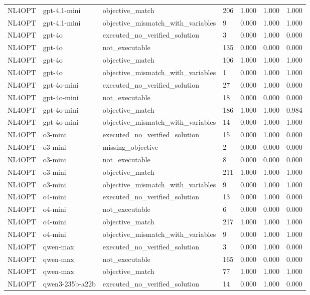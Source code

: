 \begin{table}[t]
\begin{tabular}{lllllll}
NL4OPT & gpt-4.1-mini & objective\_match & 206 & 1.000 & 1.000 & 1.000 \\
NL4OPT & gpt-4.1-mini & objective\_mismatch\_with\_variables & 9 & 0.000 & 1.000 & 1.000 \\
NL4OPT & gpt-4o & executed\_no\_verified\_solution & 3 & 0.000 & 1.000 & 0.000 \\
NL4OPT & gpt-4o & not\_executable & 135 & 0.000 & 0.000 & 0.000 \\
NL4OPT & gpt-4o & objective\_match & 106 & 1.000 & 1.000 & 1.000 \\
NL4OPT & gpt-4o & objective\_mismatch\_with\_variables & 1 & 0.000 & 1.000 & 1.000 \\
NL4OPT & gpt-4o-mini & executed\_no\_verified\_solution & 27 & 0.000 & 1.000 & 0.000 \\
NL4OPT & gpt-4o-mini & not\_executable & 18 & 0.000 & 0.000 & 0.000 \\
NL4OPT & gpt-4o-mini & objective\_match & 186 & 1.000 & 1.000 & 0.984 \\
NL4OPT & gpt-4o-mini & objective\_mismatch\_with\_variables & 14 & 0.000 & 1.000 & 1.000 \\
NL4OPT & o3-mini & executed\_no\_verified\_solution & 15 & 0.000 & 1.000 & 0.000 \\
NL4OPT & o3-mini & missing\_objective & 2 & 0.000 & 0.000 & 0.000 \\
NL4OPT & o3-mini & not\_executable & 8 & 0.000 & 0.000 & 0.000 \\
NL4OPT & o3-mini & objective\_match & 211 & 1.000 & 1.000 & 1.000 \\
NL4OPT & o3-mini & objective\_mismatch\_with\_variables & 9 & 0.000 & 1.000 & 1.000 \\
NL4OPT & o4-mini & executed\_no\_verified\_solution & 13 & 0.000 & 1.000 & 0.000 \\
NL4OPT & o4-mini & not\_executable & 6 & 0.000 & 0.000 & 0.000 \\
NL4OPT & o4-mini & objective\_match & 217 & 1.000 & 1.000 & 1.000 \\
NL4OPT & o4-mini & objective\_mismatch\_with\_variables & 9 & 0.000 & 1.000 & 1.000 \\
NL4OPT & qwen-max & executed\_no\_verified\_solution & 3 & 0.000 & 1.000 & 0.000 \\
NL4OPT & qwen-max & not\_executable & 165 & 0.000 & 0.000 & 0.000 \\
NL4OPT & qwen-max & objective\_match & 77 & 1.000 & 1.000 & 1.000 \\
NL4OPT & qwen3-235b-a22b & executed\_no\_verified\_solution & 14 & 0.000 & 1.000 & 0.000 \\

\end{tabular}
\end{table}
